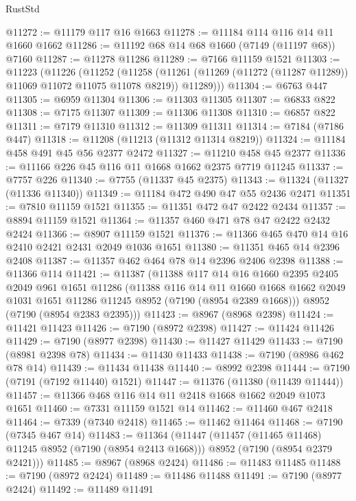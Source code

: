 \begin{lexlean}{RustStd}
\begin{coremodule}
@11272 := @11179 @117 @16 @1663
@11278 := @11184 @114 @116 @14 @11 @1660 @1662
@11286 := @11192 @68 @14 @68 @1660 (@7149 (@11197 @68)) @7160
@11287 := @11278 @11286
@11289 := @7166 @11159 @1521
@11303 := @11223
    (@11226
      (@11252
        (@11258
          (@11261 (@11269 (@11272 (@11287 @11289)) @11069 @11072 @11075 @11078 @8219))
          @11289)))
@11304 := @6763 @447
@11305 := @6959 @11304
@11306 := @11303 @11305
@11307 := @6833 @822
@11308 := @7175 @11307
@11309 := @11306 @11308
@11310 := @6857 @822
@11311 := @7179 @11310
@11312 := @11309 @11311
@11314 := @7184 (@7186 @447)
@11318 := @11208 (@11213 (@11312 @11314 @8219))
@11324 := @11184 @458 @491 @45 @56 @2377 @2472
@11327 := @11210 @458 @45 @2377
@11336 := @11166 @226 @45 @116 @11 @1668 @1662 @2375 @7719 @11245
@11337 := @7757 @226
@11340 := @7755 (@11337 @45 @2375)
@11343 := @11324 (@11327 (@11336 @11340))
@11349 := @11184 @472 @490 @47 @55 @2436 @2471
@11351 := @7810 @11159 @1521
@11355 := @11351 @472 @47 @2422 @2434
@11357 := @8894 @11159 @1521
@11364 := @11357 @460 @471 @78 @47 @2422 @2432 @2424
@11366 := @8907 @11159 @1521
@11376 := @11366 @465 @470 @14 @16 @2410 @2421 @2431 @2049 @1036 @1651
@11380 := @11351 @465 @14 @2396 @2408
@11387 := @11357 @462 @464 @78 @14 @2396 @2406 @2398
@11388 := @11366 @114
@11421 := @11387
    (@11388
      @117
      @14
      @16
      @1660
      @2395
      @2405
      @2049
      @961
      @1651
      @11286
      (@11388
        @116
        @14
        @11
        @1660
        @1668
        @1662
        @2049
        @1031
        @1651
        @11286
        @11245
        @8952
        (@7190 (@8954 @2389 @1668)))
      @8952
      (@7190 (@8954 @2383 @2395)))
@11423 := @8967 (@8968 @2398)
@11424 := @11421 @11423
@11426 := @7190 (@8972 @2398)
@11427 := @11424 @11426
@11429 := @7190 (@8977 @2398)
@11430 := @11427 @11429
@11433 := @7190 (@8981 @2398 @78)
@11434 := @11430 @11433
@11438 := @7190 (@8986 @462 @78 @14)
@11439 := @11434 @11438
@11440 := @8992 @2398
@11444 := @7190 (@7191 (@7192 @11440) @1521)
@11447 := @11376 (@11380 (@11439 @11444))
@11457 := @11366 @468 @116 @14 @11 @2418 @1668 @1662 @2049 @1073 @1651
@11460 := @7331 @11159 @1521 @14
@11462 := @11460 @467 @2418
@11464 := @7339 (@7340 @2418)
@11465 := @11462 @11464
@11468 := @7190 (@7345 @467 @14)
@11483 := @11364
    (@11447
      (@11457 (@11465 @11468) @11245 @8952 (@7190 (@8954 @2413 @1668)))
      @8952
      (@7190 (@8954 @2379 @2421)))
@11485 := @8967 (@8968 @2424)
@11486 := @11483 @11485
@11488 := @7190 (@8972 @2424)
@11489 := @11486 @11488
@11491 := @7190 (@8977 @2424)
@11492 := @11489 @11491

\end{coremodule}
\end{lexlean}
